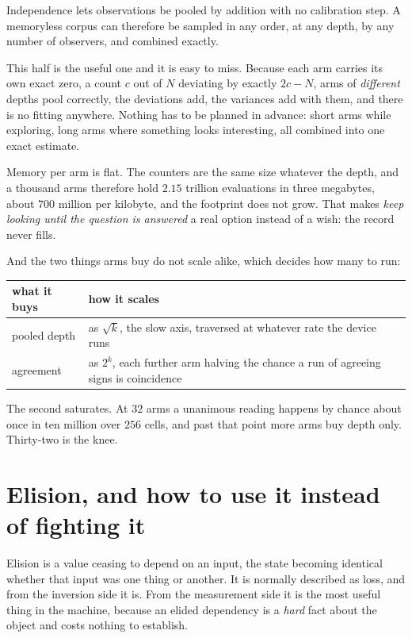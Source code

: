 Independence lets observations be pooled by addition with no calibration step. A memoryless corpus can therefore be sampled in any order, at any depth, by any number of observers, and combined exactly.

This half is the useful one and it is easy to miss. Because each arm carries its own exact zero, a count \(c\) out of \(N\) deviating by exactly \(2c - N\), arms of \emph{different} depths pool correctly, the deviations add, the variances add with them, and there is no fitting anywhere. Nothing has to be planned in advance: short arms while exploring, long arms where something looks interesting, all combined into one exact estimate.

Memory per arm is flat. The counters are the same size whatever the depth, and a thousand arms therefore hold \(2.15\) trillion evaluations in three megabytes, about \(700\) million per kilobyte, and the footprint does not grow. That makes \emph{keep looking until the question is answered} a real option instead of a wish: the record never fills.

And the two things arms buy do not scale alike, which decides how many to run:

\begin{center}
\begin{tabular}{@{}ll@{}}
\toprule
what it buys & how it scales \\
\midrule
pooled depth & as \(\sqrt{k}\), the slow axis, traversed at whatever rate the device runs \\
agreement & as \(2^{k}\), each further arm halving the chance a run of agreeing signs is coincidence \\
\bottomrule
\end{tabular}
\end{center}

The second saturates. At \(32\) arms a unanimous reading happens by chance about once in ten million over \(256\) cells, and past that point more arms buy depth only. Thirty-two is the knee.

\section{Elision, and how to use it instead of fighting it}

Elision is a value ceasing to depend on an input, the state becoming identical whether that input was one thing or another. It is normally described as loss, and from the inversion side it is. From the measurement side it is the most useful thing in the machine, because an elided dependency is a \emph{hard} fact about the object and costs nothing to establish.

